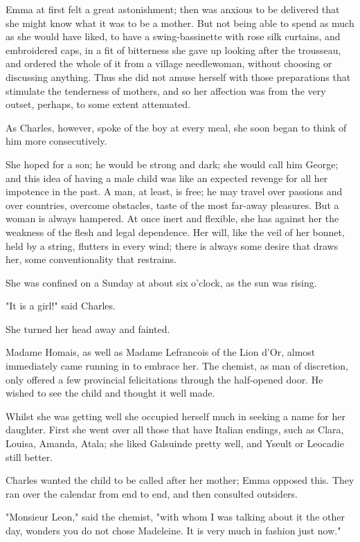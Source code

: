 \documentclass{tufte-book}
\begin{document}
Emma at first felt a great astonishment; then was anxious to be
delivered that she might know what it was to be a mother. But not
being able to spend as much as she would have liked, to have a
swing-bassinette with rose silk curtains, and embroidered caps, in a fit
of bitterness she gave up looking after the trousseau, and ordered the
whole of it from a village needlewoman, without choosing or discussing
anything. Thus she did not amuse herself with those preparations that
stimulate the tenderness of mothers, and so her affection was from the
very outset, perhaps, to some extent attenuated.

As Charles, however, spoke of the boy at every meal, she soon began to
think of him more consecutively.

She hoped for a son; he would be strong and dark; she would call him
George; and this idea of having a male child was like an expected
revenge for all her impotence in the past. A man, at least, is free; he
may travel over passions and over countries, overcome obstacles, taste
of the most far-away pleasures. But a woman is always hampered. At once
inert and flexible, she has against her the weakness of the flesh and
legal dependence. Her will, like the veil of her bonnet, held by a
string, flutters in every wind; there is always some desire that draws
her, some conventionality that restrains.

She was confined on a Sunday at about six o'clock, as the sun was
rising.

"It is a girl!" said Charles.

She turned her head away and fainted.

Madame Homais, as well as Madame Lefrancois of the Lion d'Or, almost
immediately came running in to embrace her. The chemist, as man of
discretion, only offered a few provincial felicitations through the
half-opened door. He wished to see the child and thought it well made.

Whilst she was getting well she occupied herself much in seeking a
name for her daughter. First she went over all those that have Italian
endings, such as Clara, Louisa, Amanda, Atala; she liked Galsuinde
pretty well, and Yseult or Leocadie still better.

Charles wanted the child to be called after her mother; Emma opposed
this. They ran over the calendar from end to end, and then consulted
outsiders.

"Monsieur Leon," said the chemist, "with whom I was talking about it
the other day, wonders you do not chose Madeleine. It is very much in
fashion just now."
\end{document}
